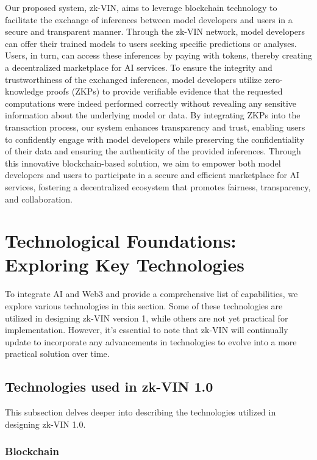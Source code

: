 \documentclass[conference]{IEEEtran}
\begin{document}
Our proposed system, zk-VIN, aims to leverage blockchain technology to facilitate the exchange of inferences between model developers and users in a secure and transparent manner. Through the zk-VIN network, model developers can offer their trained models to users seeking specific predictions or analyses. Users, in turn, can access these inferences by paying with tokens, thereby creating a decentralized marketplace for AI services. To ensure the integrity and trustworthiness of the exchanged inferences, model developers utilize zero-knowledge proofs (ZKPs) to provide verifiable evidence that the requested computations were indeed performed correctly without revealing any sensitive information about the underlying model or data. By integrating ZKPs into the transaction process, our system enhances transparency and trust, enabling users to confidently engage with model developers while preserving the confidentiality of their data and ensuring the authenticity of the provided inferences. Through this innovative blockchain-based solution, we aim to empower both model developers and users to participate in a secure and efficient marketplace for AI services, fostering a decentralized ecosystem that promotes fairness, transparency, and collaboration.

\section{Technological Foundations: Exploring Key Technologies}
To integrate AI and Web3 and provide a comprehensive list of capabilities, we explore various technologies in this section. Some of these technologies are utilized in designing zk-VIN version 1, while others are not yet practical for implementation. However, it's essential to note that zk-VIN will continually update to incorporate any advancements in technologies to evolve into a more practical solution over time.

\subsection{Technologies used in zk-VIN 1.0}

This subsection delves deeper into describing the technologies utilized in designing zk-VIN 1.0.

\subsubsection{Blockchain}
\end{document}
